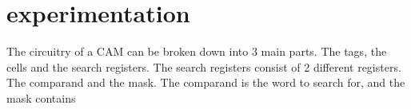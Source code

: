 \section{experimentation}
The circuitry of a CAM can be broken down into 3 main parts. The tags, the cells and the search registers. 
The search registers consist of 2 different registers. 
The comparand and the mask. The comparand is the word to search for, and the mask contains